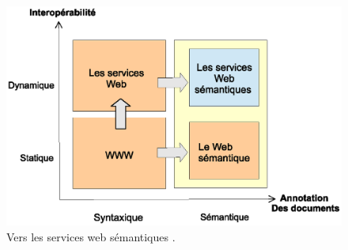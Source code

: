 \begin{figure}[h]
    \centering
    \includegraphics[width=1.1\textwidth]{figs/3w_to_sws.eps}
    \caption{Vers les services web sémantiques \cite{fensel2002semantic}.}
    \label{fig:3w_to_sws}
\end{figure}

